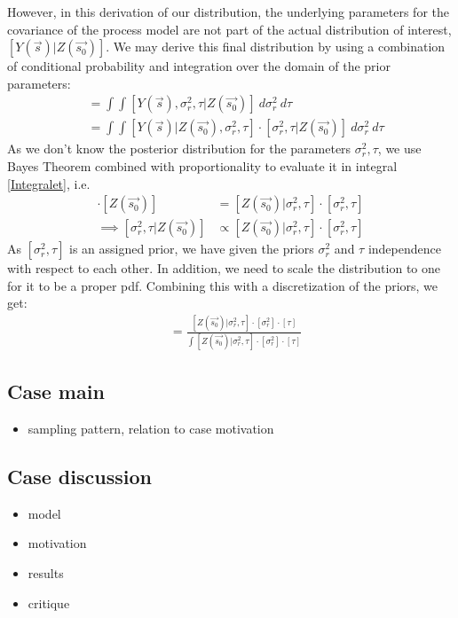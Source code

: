 However, in this derivation of our distribution, the underlying parameters for the covariance of the process model are not part of the actual distribution of interest, $[Y(\vec{s}) | Z(\vec{s_0})]$. We may derive this final distribution by using a combination of conditional probability and integration over the domain of the prior parameters:
\begin{align*}
[Y(\vec{s}) | Z(\vec{s_0})] &= \int \int [Y(\vec{s}), \sigma_r^2, \tau | Z(\vec{s_0})] \ d\sigma_r^2 \ d\tau \\
&= \int \int [Y(\vec{s})| Z(\vec{s_0}), \sigma_r^2, \tau] \cdot [\sigma_r^2, \tau | Z(\vec{s_0})] \ d\sigma_r^2 \ d\tau
\end{align*}
As we don't know the posterior distribution for the parameters $\sigma_r^2, \tau$, we use Bayes Theorem combined with proportionality to evaluate it in integral \ref{Integralet}, i.e.
\begin{align*}
[\sigma_r^2, \tau | Z(\vec{s_0})] \cdot [Z(\vec{s_0})] &= [Z(\vec{s_0}) | \sigma_r^2, \tau] \cdot [\sigma_r^2, \tau] \\
\implies [\sigma_r^2, \tau | Z(\vec{s_0})] &\propto [Z(\vec{s_0}) | \sigma_r^2, \tau] \cdot [\sigma_r^2, \tau]
\end{align*}
As $[\sigma_r^2, \tau]$ is an assigned prior, we have given the priors $\sigma_r^2$ and $\tau$ independence with respect to each other. In addition, we need to scale the distribution to one for it to be a proper pdf. Combining this with a discretization of the priors, we get:
\begin{align*}
[\sigma_r^2, \tau | Z(\vec{s_0})] &= \frac{[Z(\vec{s_0}) | \sigma_r^2, \tau] \cdot [\sigma_r^2]\cdot [\tau]} {\int [Z(\vec{s_0}) | \sigma_r^2, \tau] \cdot [\sigma_r^2]\cdot [\tau] }
\end{align*}

\subsection{Case main}
\begin{itemize}
\item sampling pattern,  relation to case motivation
\end{itemize}
\subsection{Case discussion}
\begin{itemize}
\item model
\item motivation
\item results
\item critique
\end{itemize}

